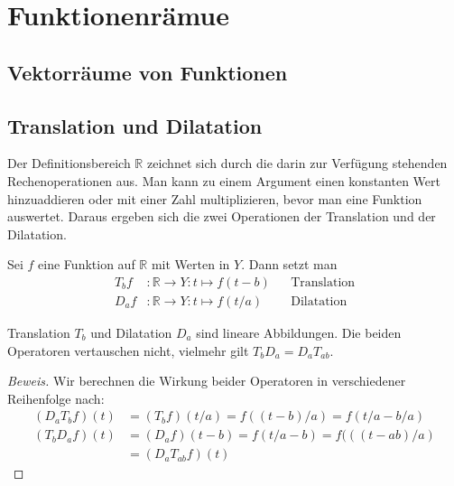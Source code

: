 %
%
%
\section{Funktionenrämue
\label{section:funktionenraume}}

\subsection{Vektorräume von Funktionen}

\subsection{Translation und Dilatation}
Der Definitionsbereich $\mathbb R$ zeichnet sich durch die darin zur
Verfügung stehenden Rechenoperationen aus.
Man kann zu einem Argument einen konstanten Wert hinzuaddieren oder mit
einer Zahl multiplizieren, bevor man eine Funktion auswertet.
Daraus ergeben sich die zwei Operationen der Translation und der Dilatation.

\begin{definition}
Sei $f$ eine Funktion auf $\mathbb R$ mit Werten in $Y$.
Dann setzt man
\begin{align*}
T_bf&\colon \mathbb R \to Y: t\mapsto f(t-b)&&\text{Translation}
\\
D_af&\colon \mathbb R \to Y: t\mapsto f(t/a)&&\text{Dilatation}
\end{align*}
\end{definition}



\begin{satz}
Translation $T_b$ und Dilatation $D_a$ sind lineare Abbildungen.
Die beiden Operatoren vertauschen nicht, vielmehr gilt
$T_bD_a = D_aT_{ab}$.
\end{satz}

\begin{proof}[Beweis]

Wir berechnen die Wirkung beider Operatoren in verschiedener Reihenfolge
nach:
\begin{align*}
(D_aT_bf)(t)
&=
(T_bf)(t/a)
=
f((t-b)/a) = f(t/a - b/a)
\\
(T_bD_a f)(t)
&=
(D_af)(t - b)
=
f(t/a - b)
=
f(((t-ab)/a)
\\
&=
(D_aT_{ab}f)(t)
\end{align*}
\end{proof}

